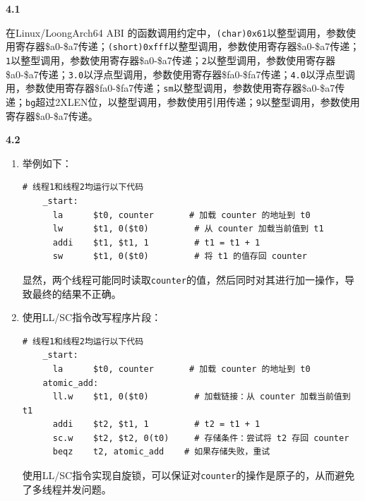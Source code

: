 \documentclass[UTF8]{report}
\begin{document}
\pagestyle{fancy}

\maketitle


\noindent
\textbf{4.1}

在Linux/LoongArch64 ABI 的函数调用约定中，\texttt{(char)0x61}以整型调用，参数使用寄存器\$a0-\$a7传递；\texttt{(short)0xfff}以整型调用，参数使用寄存器\$a0-\$a7传递；\texttt{1}以整型调用，参数使用寄存器\$a0-\$a7传递；\texttt{2}以整型调用，参数使用寄存器\$a0-\$a7传递；\texttt{3.0}以浮点型调用，参数使用寄存器\$fa0-\$fa7传递；\texttt{4.0}以浮点型调用，参数使用寄存器\$fa0-\$fa7传递；\texttt{sm}以整型调用，参数使用寄存器\$a0-\$a7传递；\texttt{bg}超过2XLEN位，以整型调用，参数使用引用传递；\texttt{9}以整型调用，参数使用寄存器\$a0-\$a7传递。

\noindent
\textbf{4.2}

\begin{enumerate}[label=(\arabic*)]
  \item 举例如下：
  
  \begin{lstlisting}[language=LoongArch]
    # 线程1和线程2均运行以下代码
    _start: 
      la      $t0, counter       # 加载 counter 的地址到 t0
      lw      $t1, 0($t0)         # 从 counter 加载当前值到 t1
      addi    $t1, $t1, 1         # t1 = t1 + 1
      sw      $t1, 0($t0)         # 将 t1 的值存回 counter
  \end{lstlisting}

  显然，两个线程可能同时读取\texttt{counter}的值，然后同时对其进行加一操作，导致最终的结果不正确。

  \item 使用LL/SC指令改写程序片段：
  
  \begin{lstlisting}[language=LoongArch]
    # 线程1和线程2均运行以下代码
    _start:
      la      $t0, counter       # 加载 counter 的地址到 t0
    atomic_add:  
      ll.w    $t1, 0($t0)         # 加载链接：从 counter 加载当前值到 t1
      addi    $t2, $t1, 1         # t2 = t1 + 1
      sc.w    $t2, $t2, 0(t0)     # 存储条件：尝试将 t2 存回 counter
      beqz    t2, atomic_add    # 如果存储失败，重试
  \end{lstlisting}

  使用LL/SC指令实现自旋锁，可以保证对\texttt{counter}的操作是原子的，从而避免了多线程并发问题。
\end{enumerate}
\end{document}
